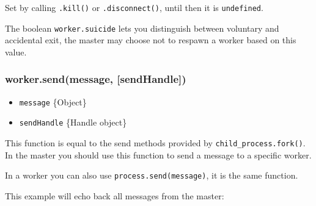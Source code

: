 Set by calling \texttt{.kill()} or \texttt{.disconnect()}, until then it
is \texttt{undefined}.

The boolean \texttt{worker.suicide} lets you distinguish between
voluntary and accidental exit, the master may choose not to respawn a
worker based on this value.

\begin{Shaded}
\begin{Highlighting}[]
\NormalTok{(}\NormalTok{, }
   \NormalTok{(} \NormalTok{=== }\NormalTok{) \{}
    \NormalTok{(}
  \NormalTok{\}}
\NormalTok{\});}

\NormalTok{();}
\end{Highlighting}
\end{Shaded}

\subsubsection{worker.send(message,
{[}sendHandle{]})}\label{worker.sendmessage-sendhandle}

\begin{itemize}
\itemsep1pt\parskip0pt
\item
  \texttt{message} \{Object\}
\item
  \texttt{sendHandle} \{Handle object\}
\end{itemize}

This function is equal to the send methods provided by
\texttt{child\_process.fork()}. In the master you should use this
function to send a message to a specific worker.

In a worker you can also use \texttt{process.send(message)}, it is the
same function.

This example will echo back all messages from the master:

\begin{Shaded}
\begin{Highlighting}[]
 \NormalTok{(}\NormalTok{) \{}
   \NormalTok{();}
  \NormalTok{(}\NormalTok{);}

\NormalTok{\} }  \NormalTok{(}\NormalTok{) \{}
  \NormalTok{(}\NormalTok{, }
  \NormalTok{\});}
\NormalTok{\}}
\end{Highlighting}
\end{Shaded}

